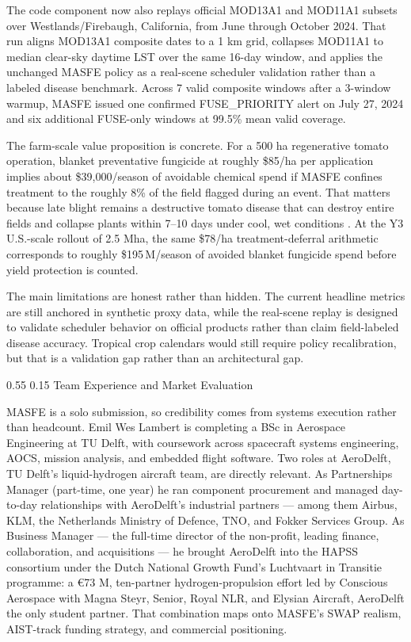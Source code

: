 \documentclass[11pt,letterpaper]{article}
\makeatletter
\renewcommand\section{\@startsection{section}{1}{\z@}
  {0.55\baselineskip}
  {0.15\baselineskip}
  {\normalfont\large\bfseries}}
\makeatother
\begin{document}
The code component now also replays official MOD13A1 and MOD11A1 subsets over Westlands/Firebaugh, California, from June through October 2024. That run aligns MOD13A1 composite dates to a 1 km grid, collapses MOD11A1 to median clear-sky daytime LST over the same 16-day window, and applies the unchanged MASFE policy as a real-scene scheduler validation rather than a labeled disease benchmark. Across 7 valid composite windows after a 3-window warmup, MASFE issued one confirmed FUSE\_PRIORITY alert on July 27, 2024 and six additional FUSE-only windows at 99.5\% mean valid coverage.

The farm-scale value proposition is concrete. For a 500 ha regenerative tomato operation, blanket preventative fungicide at roughly \$85/ha per application implies about \$39{,}000/season of avoidable chemical spend if MASFE confines treatment to the roughly 8\% of the field flagged during an event. That matters because late blight remains a destructive tomato disease that can destroy entire fields and collapse plants within 7--10 days under cool, wet conditions \cite{wisconsin-lateblight}. At the Y3 U.S.-scale rollout of 2.5 Mha, the same \$78/ha treatment-deferral arithmetic corresponds to roughly \$195\,M/season of avoided blanket fungicide spend before yield protection is counted.

The main limitations are honest rather than hidden. The current headline metrics are still anchored in synthetic proxy data, while the real-scene replay is designed to validate scheduler behavior on official products rather than claim field-labeled disease accuracy. Tropical crop calendars would still require policy recalibration, but that is a validation gap rather than an architectural gap.

\section{Team Experience and Market Evaluation}

MASFE is a solo submission, so credibility comes from systems execution rather than headcount. Emil Wes Lambert is completing a BSc in Aerospace Engineering at TU Delft, with coursework across spacecraft systems engineering, AOCS, mission analysis, and embedded flight software. Two roles at AeroDelft, TU Delft's liquid-hydrogen aircraft team, are directly relevant. As Partnerships Manager (part-time, one year) he ran component procurement and managed day-to-day relationships with AeroDelft's industrial partners — among them Airbus, KLM, the Netherlands Ministry of Defence, TNO, and Fokker Services Group. As Business Manager — the full-time director of the non-profit, leading finance, collaboration, and acquisitions — he brought AeroDelft into the HAPSS consortium under the Dutch National Growth Fund's Luchtvaart in Transitie programme: a €73 M, ten-partner hydrogen-propulsion effort led by Conscious Aerospace with Magna Steyr, Senior, Royal NLR, and Elysian Aircraft, AeroDelft the only student partner. That combination maps onto MASFE's SWAP realism, AIST-track funding strategy, and commercial positioning.
\end{document}
